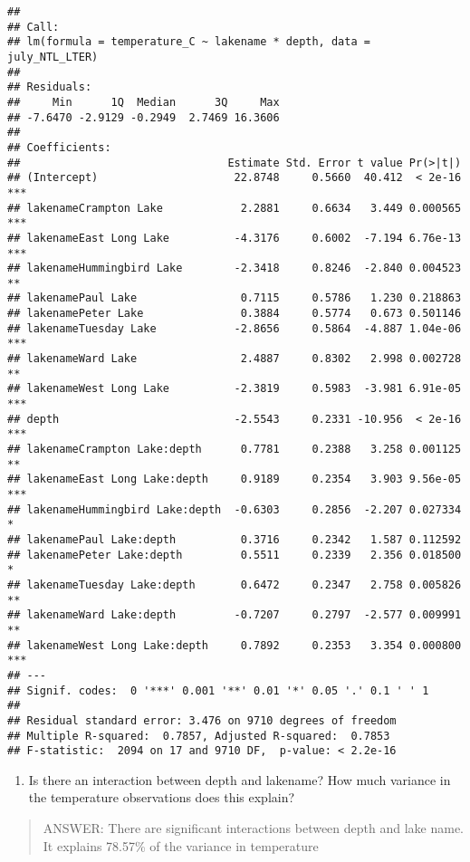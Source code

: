 \documentclass[]{article}
\providecommand{\tightlist}{%
  \setlength{\itemsep}{0pt}\setlength{\parskip}{0pt}}
\begin{document}
\begin{verbatim}
## 
## Call:
## lm(formula = temperature_C ~ lakename * depth, data = july_NTL_LTER)
## 
## Residuals:
##     Min      1Q  Median      3Q     Max 
## -7.6470 -2.9129 -0.2949  2.7469 16.3606 
## 
## Coefficients:
##                                Estimate Std. Error t value Pr(>|t|)    
## (Intercept)                     22.8748     0.5660  40.412  < 2e-16 ***
## lakenameCrampton Lake            2.2881     0.6634   3.449 0.000565 ***
## lakenameEast Long Lake          -4.3176     0.6002  -7.194 6.76e-13 ***
## lakenameHummingbird Lake        -2.3418     0.8246  -2.840 0.004523 ** 
## lakenamePaul Lake                0.7115     0.5786   1.230 0.218863    
## lakenamePeter Lake               0.3884     0.5774   0.673 0.501146    
## lakenameTuesday Lake            -2.8656     0.5864  -4.887 1.04e-06 ***
## lakenameWard Lake                2.4887     0.8302   2.998 0.002728 ** 
## lakenameWest Long Lake          -2.3819     0.5983  -3.981 6.91e-05 ***
## depth                           -2.5543     0.2331 -10.956  < 2e-16 ***
## lakenameCrampton Lake:depth      0.7781     0.2388   3.258 0.001125 ** 
## lakenameEast Long Lake:depth     0.9189     0.2354   3.903 9.56e-05 ***
## lakenameHummingbird Lake:depth  -0.6303     0.2856  -2.207 0.027334 *  
## lakenamePaul Lake:depth          0.3716     0.2342   1.587 0.112592    
## lakenamePeter Lake:depth         0.5511     0.2339   2.356 0.018500 *  
## lakenameTuesday Lake:depth       0.6472     0.2347   2.758 0.005826 ** 
## lakenameWard Lake:depth         -0.7207     0.2797  -2.577 0.009991 ** 
## lakenameWest Long Lake:depth     0.7892     0.2353   3.354 0.000800 ***
## ---
## Signif. codes:  0 '***' 0.001 '**' 0.01 '*' 0.05 '.' 0.1 ' ' 1
## 
## Residual standard error: 3.476 on 9710 degrees of freedom
## Multiple R-squared:  0.7857, Adjusted R-squared:  0.7853 
## F-statistic:  2094 on 17 and 9710 DF,  p-value: < 2.2e-16
\end{verbatim}

\begin{enumerate}
\def\labelenumi{\arabic{enumi}.}
\setcounter{enumi}{14}
\tightlist
\item
  Is there an interaction between depth and lakename? How much variance
  in the temperature observations does this explain?
\end{enumerate}

\begin{quote}
ANSWER: There are significant interactions between depth and lake name.
It explains 78.57\% of the variance in temperature
\end{quote}
\end{document}
